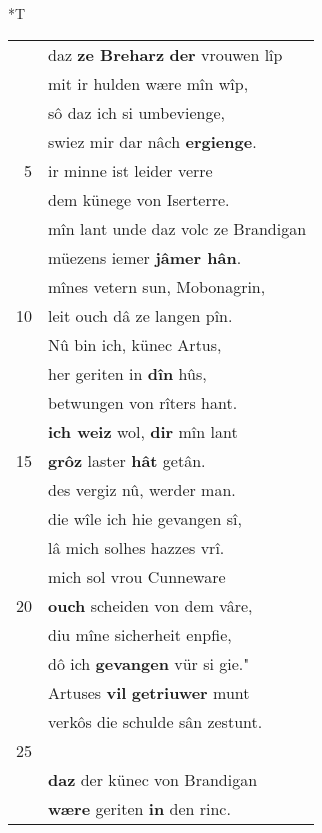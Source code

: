 \documentclass[8pt,a4paper,notitlepage]{article}
\begin{document}
\begin{table}[ht]
\begin{minipage}[t]{0.5\linewidth}
\end{minipage}
\hspace{0.5cm}
\begin{minipage}[t]{0.5\linewidth}
\small
\begin{center}*T
\end{center}
\begin{tabular}{rl}
 & daz \textbf{ze Breharz} \textbf{der} vrouwen lîp\\ 
 & mit ir hulden wære mîn wîp,\\ 
 & sô daz ich si umbevienge,\\ 
 & swiez mir dar nâch \textbf{ergienge}.\\ 
5 & ir minne ist leider verre\\ 
 & dem künege von Iserterre.\\ 
 & mîn lant unde daz volc ze Brandigan\\ 
 & müezens iemer \textbf{jâmer hân}.\\ 
 & mînes vetern sun, Mobonagrin,\\ 
10 & leit ouch dâ ze langen pîn.\\ 
 & Nû bin ich, künec Artus,\\ 
 & her geriten in \textbf{dîn} hûs,\\ 
 & betwungen von rîters hant.\\ 
 & \textbf{ich weiz} wol, \textbf{dir} mîn lant\\ 
15 & \textbf{grôz} laster \textbf{hât} getân.\\ 
 & des vergiz nû, werder man.\\ 
 & die wîle ich hie gevangen sî,\\ 
 & lâ mich solhes hazzes vrî.\\ 
 & mich sol vrou Cunneware\\ 
20 & \textbf{ouch} scheiden von dem vâre,\\ 
 & diu mîne sicherheit enpfie,\\ 
 & dô ich \textbf{gevangen} vür si gie."\\ 
 & Artuses \textbf{vil} \textbf{getriuwer} munt\\ 
 & verkôs die schulde sân zestunt.\\ 
25 & \textit{\begin{large}D\end{large}}ô vriesch wîp unde man,\\ 
 & \textbf{daz} der künec von Brandigan\\ 
 & \textbf{wære} geriten \textbf{in} den rinc.\\ 

\end{tabular}
\end{minipage}
\end{table}
\end{document}
